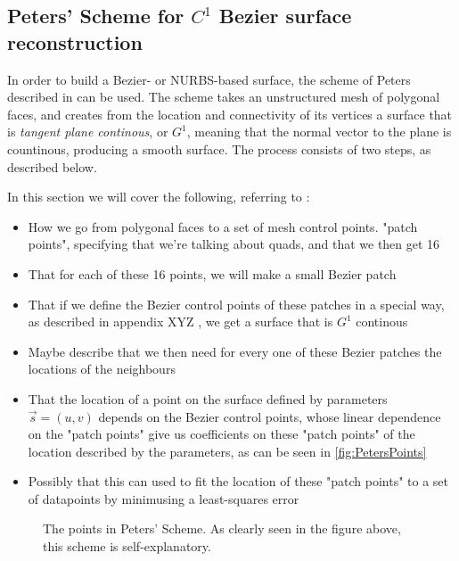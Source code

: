 \subsection{Peters' Scheme for $C^1$ Bezier surface reconstruction}
In order to build a Bezier- or NURBS-based surface, the scheme of Peters described in \cite{peters1992constructing} can be used. The scheme takes an unstructured mesh of polygonal faces, and creates from the location and connectivity of its vertices a surface that is \emph{tangent plane continous}, or $G^1$, meaning that the normal vector to the plane is countinous, producing a smooth surface. The process consists of two steps, as described below.

In this section we will cover the following, referring to \cite{peters1992constructing}:
\begin{itemize}
\item How we go from polygonal faces to a set of mesh control points. "patch points", specifying that we're talking about quads, and that we then get 16
\item That for each of these 16 points, we will make a small Bezier patch
\item That if we define the Bezier control points of these patches in a special way, as described in appendix XYZ , we get a surface that is $G^1$ continous
\item Maybe describe that we then need for every one of these Bezier patches the locations of the neighbours
\item That the location of a point on the surface defined by parameters $\vec{s} = (u,v)$ depends on the Bezier control points, whose linear dependence on the "patch points" give us coefficients on these "patch points" of the location described by the parameters, as can be seen in \autoref{fig:PetersPoints}
\item Possibly that this can used to fit the location of these "patch points" to a set of datapoints by minimusing a least-squares error 
\end{itemize}
\begin{figure}

\label{fig:PetersPoints}
\caption{The points in Peters' Scheme. As clearly seen in the figure above, this scheme is self-explanatory.}
\end{figure}